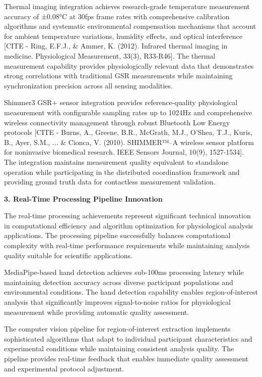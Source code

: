 \documentclass[12pt,a4paper]{report}
\begin{document}
Thermal imaging integration achieves research-grade temperature measurement accuracy of ±0.08°C at 30fps frame rates
with comprehensive calibration algorithms and systematic environmental compensation mechanisms that account for ambient
temperature variations, humidity effects, and optical
interference [CITE - Ring, E.F.J., \& Ammer, K. (2012). Infrared thermal imaging in medicine. Physiological Measurement, 33(3), R33-R46].
The thermal measurement capability provides physiologically relevant data that demonstrates strong correlations with
traditional GSR measurements while maintaining synchronization precision across all sensing modalities.

Shimmer3 GSR+ sensor integration provides reference-quality physiological measurement with configurable sampling rates
up to 1024Hz and comprehensive wireless connectivity management through robust Bluetooth Low Energy
protocols [CITE - Burns, A., Greene, B.R., McGrath, M.J., O'Shea, T.J., Kuris, B., Ayer, S.M., ... \& Cionca, V. (2010). SHIMMER™–A wireless sensor platform for noninvasive biomedical research. IEEE Sensors Journal, 10(9), 1527-1534].
The integration maintains measurement quality equivalent to standalone operation while participating in the distributed
coordination framework and providing ground truth data for contactless measurement validation.

\textbf{3. Real-Time Processing Pipeline Innovation}

The real-time processing achievements represent significant technical innovation in computational efficiency and
algorithm optimization for physiological analysis applications. The processing pipeline successfully balances
computational complexity with real-time performance requirements while maintaining analysis quality suitable for
scientific applications.

MediaPipe-based hand detection achieves sub-100ms processing latency while maintaining detection accuracy across diverse
participant populations and environmental conditions. The hand detection capability enables region-of-interest analysis
that significantly improves signal-to-noise ratios for physiological measurement while providing automatic quality
assessment.

The computer vision pipeline for region-of-interest extraction implements sophisticated algorithms that adapt to
individual participant characteristics and experimental conditions while maintaining consistent analysis quality. The
pipeline provides real-time feedback that enables immediate quality assessment and experimental protocol adjustment.
\end{document}
